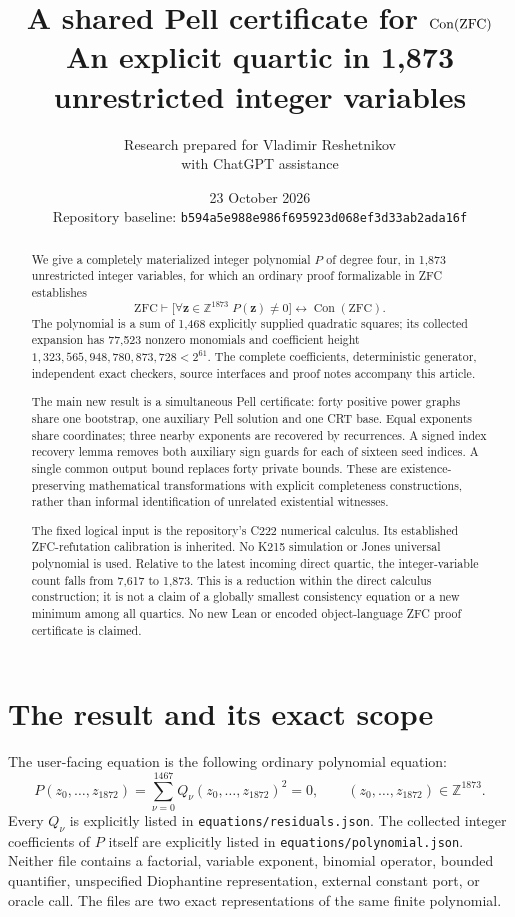 \documentclass[11pt]{article}
\title{A shared Pell certificate for $\Con(\mathrm{ZFC})$\\[4pt]
\large An explicit quartic in 1,873 unrestricted integer variables}
\author{Research prepared for Vladimir Reshetnikov\\with ChatGPT assistance}
\date{23 October 2026\\\small Repository baseline: \texttt{b594a5e988e986f695923d068ef3d33ab2ada16f}}
\theoremstyle{definition}
\theoremstyle{remark}
\newcommand{\ZZ}{\mathbb Z}
\newcommand{\Con}{\operatorname{Con}}
\newcommand{\File}[1]{\nolinkurl{#1}}
\begin{document}
\maketitle
\begin{abstract}
We give a completely materialized integer polynomial $P$ of degree four,
in 1,873 unrestricted integer variables, for which an ordinary proof
formalizable in ZFC establishes
\[
 \mathrm{ZFC}\vdash
 \bigl[\forall\mathbf z\in\ZZ^{1873}\;P(\mathbf z)\ne0\bigr]
 \longleftrightarrow \Con(\mathrm{ZFC}).
\]
The polynomial is a sum of 1,468 explicitly supplied quadratic squares;
its collected expansion has 77,523 nonzero monomials and coefficient
height $1{,}323{,}565{,}948{,}780{,}873{,}728<2^{61}$.
The complete coefficients, deterministic generator, independent exact
checkers, source interfaces and proof notes accompany this article.

The main new result is a simultaneous Pell certificate: forty positive
power graphs share one bootstrap, one auxiliary Pell solution and one
CRT base. Equal exponents share coordinates; three nearby exponents
are recovered by recurrences. A signed index recovery lemma removes
both auxiliary sign guards for each of sixteen seed indices. A single
common output bound replaces forty private bounds. These are
existence-preserving mathematical transformations with explicit
completeness constructions, rather than informal identification of
unrelated existential witnesses.

The fixed logical input is the repository's C222 numerical calculus.
Its established ZFC-refutation calibration is inherited. No K215
simulation or Jones universal polynomial is used. Relative to the latest
incoming direct quartic, the integer-variable count falls from 7,617 to
1,873. This is a reduction within the direct calculus construction;
it is not a claim of a globally smallest consistency equation or a new
minimum among all quartics. No new Lean or encoded object-language ZFC
proof certificate is claimed.
\end{abstract}
\newpage
\tableofcontents
\newpage

\section{The result and its exact scope}

The user-facing equation is the following ordinary polynomial equation:
\begin{equation}\label{eq:final}
 \boxed{P(z_0,\ldots,z_{1872})=
       \sum_{\nu=0}^{1467} Q_\nu(z_0,\ldots,z_{1872})^2=0,\qquad
       (z_0,\ldots,z_{1872})\in\ZZ^{1873}.}
\end{equation}
Every $Q_\nu$ is explicitly listed in \File{equations/residuals.json}.
The collected integer coefficients of $P$ itself are explicitly listed
in \File{equations/polynomial.json}. Neither file contains a factorial,
variable exponent, binomial operator, bounded quantifier, unspecified
Diophantine representation, external constant port, or oracle call.
The files are two exact representations of the same finite polynomial.
\end{document}
